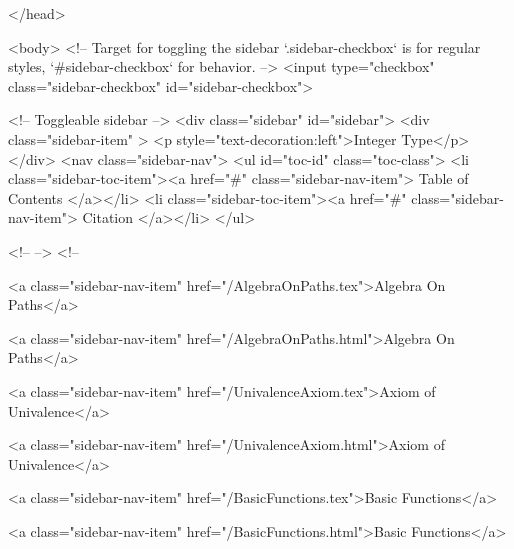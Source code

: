   
</head>




  <body>
    <!-- Target for toggling the sidebar `.sidebar-checkbox` is for regular
     styles, `#sidebar-checkbox` for behavior. -->
<input type="checkbox" class="sidebar-checkbox" id="sidebar-checkbox">

<!-- Toggleable sidebar -->
<div class="sidebar" id="sidebar">
  <div class="sidebar-item" >
    <p style="text-decoration:left">Integer Type</p>
  </div>
  <nav class="sidebar-nav">
    <ul id="toc-id" class="toc-class">
  <li class="sidebar-toc-item"><a href="#" class="sidebar-nav-item"> Table of Contents </a></li>
  <li class="sidebar-toc-item"><a href="#" class="sidebar-nav-item"> Citation </a></li>
</ul>


    <!--  -->
    <!-- 
      
    
      
    
      
    
      
        
      
    
      
        
          <a class="sidebar-nav-item" href="/AlgebraOnPaths.tex">Algebra On Paths</a>
        
      
    
      
        
          <a class="sidebar-nav-item" href="/AlgebraOnPaths.html">Algebra On Paths</a>
        
      
    
      
        
          <a class="sidebar-nav-item" href="/UnivalenceAxiom.tex">Axiom of Univalence</a>
        
      
    
      
        
          <a class="sidebar-nav-item" href="/UnivalenceAxiom.html">Axiom of Univalence</a>
        
      
    
      
        
          <a class="sidebar-nav-item" href="/BasicFunctions.tex">Basic Functions</a>
        
      
    
      
        
          <a class="sidebar-nav-item" href="/BasicFunctions.html">Basic Functions</a>
        
      
    
      
        
